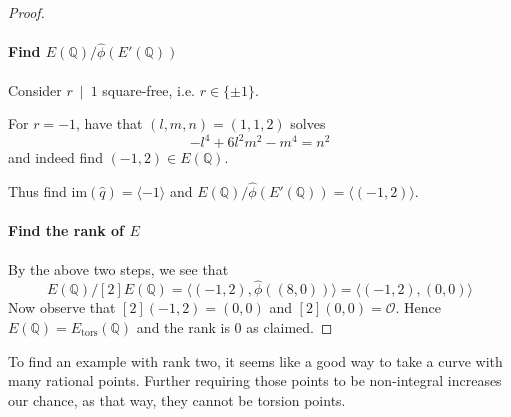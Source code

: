 \documentclass{scrartcl}
\newcommand{\Q}{\mathbb{Q}}
\newcommand{\im}{\mathrm{im}}
\renewcommand{\O}{\mathcal{O}}
\newcommand{\divides}{\ \mid \ }
\theoremstyle{definition}
\begin{document}
\begin{proof}
    \paragraph{Find $E(\Q)/\hat{\phi}(E'(\Q))$} Consider $r \divides 1$ square-free, i.e. $r \in \{ \pm 1 \}$.

    For $r = -1$, have that $(l, m, n) = (1, 1, 2)$ solves
    \begin{equation*}
        -l^4 + 6l^2m^2 - m^4 = n^2
    \end{equation*}
    and indeed find $(-1, 2) \in E(\Q)$.

    Thus find $\im(\hat{q}) = \langle -1 \rangle$ and $E(\Q)/\hat{\phi}(E'(\Q)) = \langle (-1, 2) \rangle$.

    \paragraph{Find the rank of $E$} By the above two steps, we see that
    \begin{equation*}
        E(\Q)/[2]E(\Q) = \langle (-1, 2), \hat{\phi}((8, 0)) \rangle = \langle (-1, 2), (0, 0) \rangle
    \end{equation*}
    Now observe that $[2](-1, 2) = (0, 0)$ and $[2](0, 0) = \O$.
    Hence $E(\Q) = E_{\mathrm{tors}}(\Q)$ and the rank is 0 as claimed.
\end{proof}
To find an example with rank two, it seems like a good way to take a curve with many rational points.
Further requiring those points to be non-integral increases our chance, as that way, they cannot be torsion points.
\end{document}
